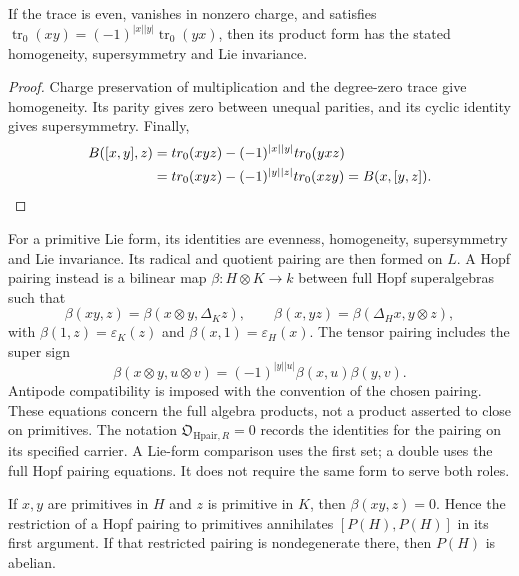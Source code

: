 \begin{proposition}
\label{prop:finite-hall-pairing-homogeneity}
\label{prop:finite-hall-pairing-supersymmetry}
\label{prop:finite-hall-pairing-invariance}
If the trace is even, vanishes in nonzero charge, and satisfies
$\operatorname{tr}_0(xy)=(-1)^{|x||y|}\operatorname{tr}_0(yx)$,
then its product form has the stated homogeneity,
supersymmetry and Lie invariance.
\end{proposition}

\begin{proof}
Charge preservation of multiplication and the degree-zero trace
give homogeneity. Its parity gives zero between unequal
parities, and its cyclic identity gives supersymmetry. Finally,
\begin{align*}
 B([x,y],z)
 &=\operatorname{tr}_0(xyz)
       -(-1)^{|x||y|}\operatorname{tr}_0(yxz)\\
 &=\operatorname{tr}_0(xyz)
       -(-1)^{|y||z|}\operatorname{tr}_0(xzy)
 =B(x,[y,z]).\qedhere
\end{align*}
\end{proof}

\begin{definition}
\label{def:finite-hopf-pairing-identity-tuple}
For a primitive Lie form, its identities are evenness,
homogeneity, supersymmetry and Lie invariance. Its radical and
quotient pairing are then formed on $L$.
A Hopf pairing instead is a bilinear map
$\beta:H\otimes K\to k$ between full Hopf superalgebras such
that
\[
 \beta(xy,z)=\beta(x\otimes y,\Delta_Kz),\qquad
 \beta(x,yz)=\beta(\Delta_Hx,y\otimes z),
\]
with $\beta(1,z)=\varepsilon_K(z)$ and
$\beta(x,1)=\varepsilon_H(x)$.
The tensor pairing includes the super sign
\[
 \beta(x\otimes y,u\otimes v)
 =(-1)^{|y||u|}\beta(x,u)\beta(y,v).
\]
Antipode compatibility is imposed with the convention of the
chosen pairing. These equations concern the full algebra
products, not a product asserted to close on primitives.
The notation $\mathfrak O_{\mathrm{Hpair},R}=0$ records the
identities for the pairing on its specified carrier. A Lie-form
comparison uses the first set; a double uses the full Hopf
pairing equations. It does not require the same form to serve
both roles.
\end{definition}

\begin{proposition}
\label{prop:finite-hall-pairing-coproduct-adjointness}
If $x,y$ are primitives in $H$ and $z$ is primitive in $K$,
then $\beta(xy,z)=0$. Hence the restriction of a Hopf pairing
to primitives annihilates $[P(H),P(H)]$ in its first argument.
If that restricted pairing is nondegenerate there, then
$P(H)$ is abelian.
\end{proposition}

